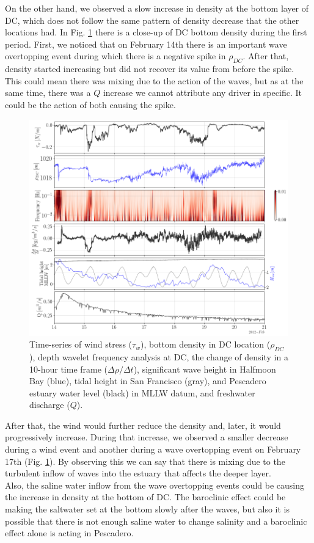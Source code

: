 \documentclass[tesis.tex]{subfiles}
\begin{document}
On the other hand, we observed a slow increase in density at the bottom layer of DC, which does not follow the same pattern of density decrease that the other locations had. In Fig. \ref{fig:mix_wo} there is a close-up of DC bottom density during the first period. First, we noticed that on February 14th there is an important wave overtopping event during which there is a negative spike in $\rho_{DC}$. After that, density started increasing but did not recover its value from before the spike. This could mean there was mixing due to the action of the waves, but as at the same time, there was a $Q$ increase we cannot attribute any driver in specific. It could be the action of both causing the spike.\\

\begin{figure}[h!]
    \centering
    \includegraphics[width=\textwidth]{Imagenes/mix_wo.png}
    \caption{Time-series of wind stress ($\tau_w$), bottom density in DC location ($\rho_{DC}$), depth wavelet frequency analysis at DC, the change of density in a 10-hour time frame ($\Delta \rho / \Delta t$), significant wave height in Halfmoon Bay (blue), tidal height in San Francisco (gray), and Pescadero estuary water level (black) in MLLW datum, and freshwater discharge ($Q$). }
    \label{fig:mix_wo}
\end{figure}

After that, the wind would further reduce the density and, later, it would progressively increase. During that increase, we observed a smaller decrease during a wind event and another during a wave overtopping event on February 17th (Fig. \ref{fig:mix_wo}). By observing this we can say that there is mixing due to the turbulent inflow of waves into the estuary that affects the deeper layer.\\ 

Also, the saline water inflow from the wave overtopping events could be causing the increase in density at the bottom of DC. The baroclinic effect could be making the saltwater set at the bottom slowly after the waves, but also it is possible that there is not enough saline water to change salinity and a baroclinic effect alone is acting in Pescadero.\\
\end{document}
